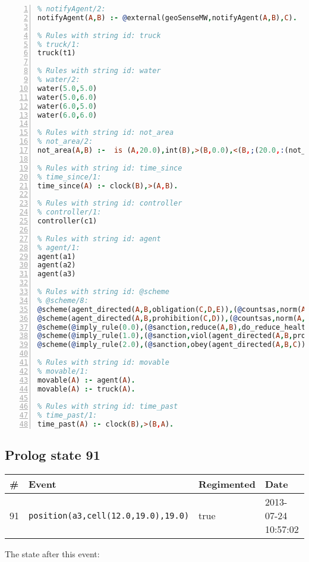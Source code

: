 \documentclass[11pt]{article}\usepackage[utf8]{inputenc}\usepackage{geometry}
\begin{document}
\begin{lstlisting}[language=Prolog, numbers=left]
% Rules with string id: notifyAgent
% notifyAgent/2:
notifyAgent(A,B) :- @external(geoSenseMW,notifyAgent(A,B),C).

% Rules with string id: truck
% truck/1:
truck(t1)

% Rules with string id: water
% water/2:
water(5.0,5.0)
water(5.0,6.0)
water(6.0,5.0)
water(6.0,6.0)

% Rules with string id: not_area
% not_area/2:
not_area(A,B) :-  is (A,20.0),int(B),>(B,0.0),<(B,;(20.0,:(not_area(A,B), is (-(B),20.0)))),int(A),>(A,0.0),<(A,;(20.0,:(area(A,B),-(int(A))))),int(B),>(A,0.0),>(B,0.0),<(A,21.0),<(B,21.0).

% Rules with string id: time_since
% time_since/1:
time_since(A) :- clock(B),>(A,B).

% Rules with string id: controller
% controller/1:
controller(c1)

% Rules with string id: agent
% agent/1:
agent(a1)
agent(a2)
agent(a3)

% Rules with string id: @scheme
% @scheme/8:
@scheme(agent_directed(A,B,obligation(C,D,E)),(@countsas,norm(A,B,F,obligation(C,D,E)),F),false,(listTrue(C)),(time_past(D)),false,[plus(viol(agent_directed(A,B,obligation(C,D,E))))|[]],[plus(obey(agent_directed(A,B,obligation(C,D,E))))|[]])
@scheme(agent_directed(A,B,prohibition(C,D)),(@countsas,norm(A,B,E,prohibition(C,D)),E),(listTrue(C)),false,(false),false,[plus(viol(agent_directed(A,B,prohibition(C,D))))|[]],[plus(obey(agent_directed(A,B,prohibition(C,D))))|[]])
@scheme(@imply_rule(0.0),(@sanction,reduce(A,B),do_reduce_health(A,B),notifyAgent(A,changed(status))),true,false,false,false,[min(reduce(A,B))|[]],[])
@scheme(@imply_rule(1.0),(@sanction,viol(agent_directed(A,B,prohibition(C,D))),do_sanction(D)),true,false,false,false,[min(viol(agent_directed(A,B,prohibition(C,D))))|[]],[])
@scheme(@imply_rule(2.0),(@sanction,obey(agent_directed(A,B,C))),true,false,false,false,[min(obey(agent_directed(A,B,C)))|[]],[])

% Rules with string id: movable
% movable/1:
movable(A) :- agent(A).
movable(A) :- truck(A).

% Rules with string id: time_past
% time_past/1:
time_past(A) :- clock(B),>(B,A).

\end{lstlisting}
\clearpage 
\subsection{Prolog state 91}
\begin{table}[ht]
\centering 
\begin{tabular}{l l l l} 
\textbf{\#} & \textbf{Event} & \textbf{Regimented} & \textbf{Date} \\ [0.5ex] 
\hline
91&\texttt{position(a3,cell(12.0,19.0),19.0)}&true&2013-07-24 10:57:02\\ [1ex] \hline\end{tabular}
\end{table}
The state after this event:
\end{document}
